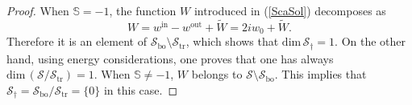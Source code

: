 \documentclass[10pt,a4paper]{amsart}
\renewcommand{\dim}{\mrm{dim}}
\newcommand{\mX}{\mathscr{S}}
\newcommand{\mrm}[1]{\mathrm{#1}}
\begin{document}
\begin{proof}
When $\mathbb{S}=-1$, the function $W$ introduced in (\ref{ScaSol}) decomposes as
\begin{equation}\label{ProofBounded}
W  = w^{\mrm{in}}-w^{\mrm{out}}+\widetilde{W}=2iw_0+\widetilde{W}.
\end{equation}
Therefore it is an element of $\mX_{\mrm{bo}}\setminus\mX_{\mrm{tr}}$, which shows that $\dim\,\mX_{\dagger}=1$. On the other hand, using energy considerations, one proves that one has always $\dim\,(\mX/\mX_{\mrm{tr}})=1$. When $\mathbb{S}\ne-1$, $W$ belongs to $\mX\setminus\mX_{\mrm{bo}}$. This implies that $\mX_{\dagger}=\mX_{\mrm{bo}}/\mX_{\mrm{tr}}=\{0\}$ in this case. 
\end{proof}
\end{document}
